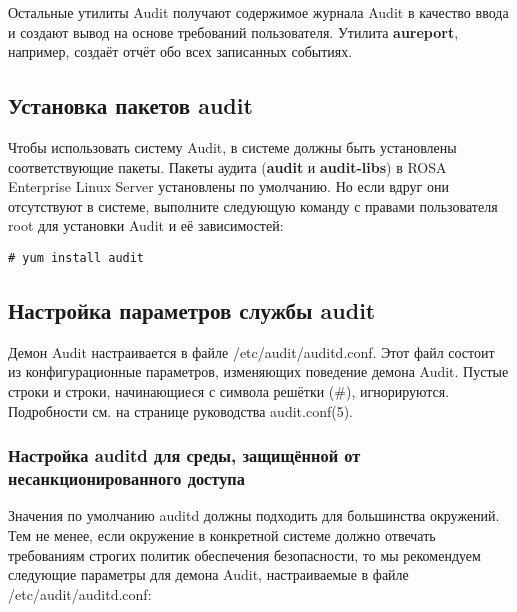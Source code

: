 \documentclass[a4paper,10pt,twoside]{article}
\begin{document}
Остальные утилиты Audit получают содержимое журнала Audit в качество ввода и создают вывод на основе требований пользователя. Утилита \textbf{aureport}, например, создаёт отчёт обо всех записанных событиях.


\subsection{Установка пакетов audit}
Чтобы использовать систему Audit, в системе должны быть установлены соответствующие пакеты. Пакеты аудита (\textbf{audit} и \textbf{audit-libs}) в ROSA Enterprise Linux Server установлены по умолчанию. Но если вдруг они отсутствуют в системе, выполните следующую команду с правами пользователя root для установки Audit и её зависимостей:
\begin{verbatim}
# yum install audit
\end{verbatim} 

\subsection{Настройка параметров службы audit}
Демон Audit настраивается в файле /etc/audit/auditd.conf. Этот файл состоит из конфигурационные параметров, изменяющих поведение демона Audit.  Пустые строки и строки, начинающиеся с символа решётки (\#), игнорируются. Подробности см. на странице руководства audit.conf(5).


\subsubsection{Настройка auditd для среды, защищённой от несанкционированного доступа}
Значения по умолчанию auditd должны подходить для большинства окружений. Тем не менее, если окружение в конкретной системе должно отвечать требованиям строгих политик обеспечения безопасности, то мы рекомендуем следующие параметры для демона Audit, настраиваемые в файле /etc/audit/auditd.conf:
\end{document}
